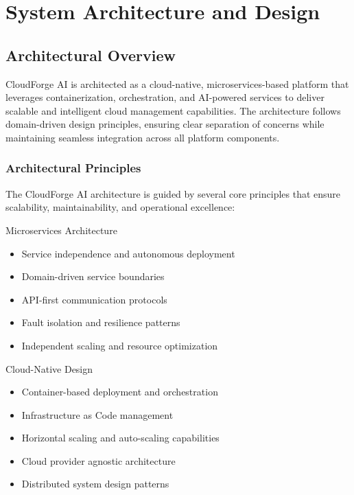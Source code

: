 \chapter{System Architecture and Design}

\section{Architectural Overview}

CloudForge AI is architected as a cloud-native, microservices-based platform that leverages containerization, orchestration, and AI-powered services to deliver scalable and intelligent cloud management capabilities. The architecture follows domain-driven design principles, ensuring clear separation of concerns while maintaining seamless integration across all platform components.

\subsection{Architectural Principles}

The CloudForge AI architecture is guided by several core principles that ensure scalability, maintainability, and operational excellence:

\begin{sprintbox}{Microservices Architecture}
\begin{itemize}
    \item Service independence and autonomous deployment
    \item Domain-driven service boundaries
    \item API-first communication protocols
    \item Fault isolation and resilience patterns
    \item Independent scaling and resource optimization
\end{itemize}
\end{sprintbox}

\begin{sprintbox}{Cloud-Native Design}
\begin{itemize}
    \item Container-based deployment and orchestration
    \item Infrastructure as Code management
    \item Horizontal scaling and auto-scaling capabilities
    \item Cloud provider agnostic architecture
    \item Distributed system design patterns
\end{itemize}
\end{sprintbox}

